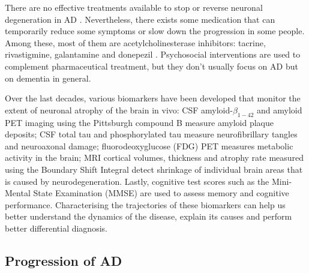 There are no effective treatments available to stop or reverse neuronal degeneration in AD \cite{Burns2009}. Nevertheless, there exists some medication that can temporarily reduce some symptoms or slow down the progression in some people. Among these, most of them are acetylcholinesterase inhibitors: tacrine, rivastigmine, galantamine and donepezil \cite{grossberg2003management}. Psychosocial interventions are used to complement pharmaceutical treatment, but they don't usually focus on AD but on dementia in general.

Over the last decades, various biomarkers have been developed that monitor the extent of neuronal atrophy of the brain in vivo: CSF amyloid-$\beta_{1-42}$ \cite{blennow2003csf} and amyloid PET imaging using the Pittsburgh compound B \cite{klunk2004imaging} measure amyloid plaque deposits; CSF total tau and phosphorylated tau \cite{blennow2003csf} measure neurofibrillary tangles and neuroaxonal damage; fluorodeoxyglucose (FDG) PET \cite{herholz2012use} measures metabolic activity in the brain; MRI cortical volumes, thickness and atrophy rate measured using the Boundary Shift Integral \cite{freeborough1997boundary} detect shrinkage of individual brain areas that is caused by neurodegeneration. Lastly, cognitive test scores such as the Mini-Mental State Examination (MMSE) \cite{mckhann1984clinical} are used to assess memory and cognitive performance. Characterising the trajectories of these biomarkers can help us better understand the dynamics of the disease, explain its causes and perform better differential diagnosis.



\subsection{Progression of AD}

